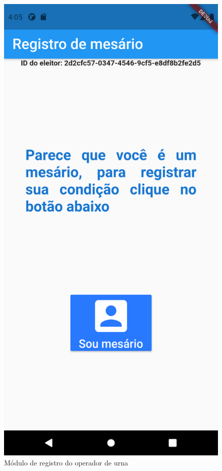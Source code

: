 \begin{figure}[!htb]
\centering
\begin{minipage}{0.47\textwidth}%
	\centering
	\includegraphics[width=.9\textwidth]{imagens/wallet_mesario}
	\caption{Módulo de registro do operador de urna}
	\label{fig:wallet_mesario}
\end{minipage}
\hfill
\begin{minipage}{0.47\textwidth}%

\end{minipage}
\end{figure}
